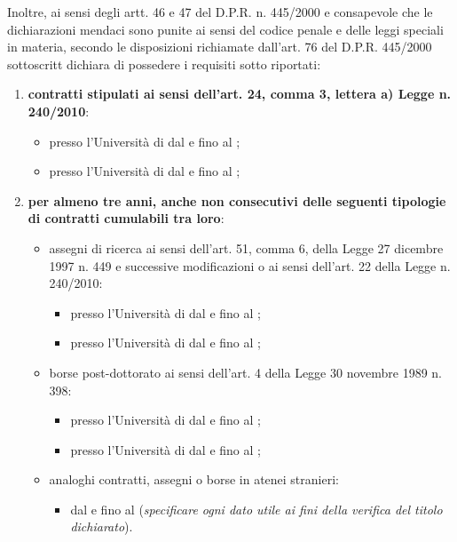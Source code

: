 Inoltre, ai sensi degli artt. 46 e 47 del D.P.R. n. 445/2000 e consapevole che 
le dichiarazioni mendaci sono punite ai sensi del codice penale e delle leggi 
speciali in materia, secondo le disposizioni richiamate dall’art. 76 del D.P.R. 
445/2000  \myTextField[.5cm]{} sottoscritt\myTextField[.5cm]{} dichiara di 
possedere i requisiti sotto riportati:
\begin{enumerate}
\item \textbf{contratti stipulati ai sensi dell'art. 24, comma 3, lettera a) 
Legge n. 240/2010}:
\begin{itemize}
 \item presso l’Università di \myTextField[4.5cm]{} dal \myTextField{} e fino 
 al \myTextField{};
 \item presso l’Università di \myTextField[4.5cm]{} dal \myTextField{} e fino 
 al \myTextField{};
\end{itemize}
\item \textbf{per almeno tre anni, anche non consecutivi delle seguenti tipologie 
di contratti cumulabili tra loro}:
\begin{itemize}
\item assegni di ricerca ai sensi dell’art. 51, comma 6, della Legge 27 dicembre
 1997 n. 449 e successive modificazioni o ai sensi dell’art. 22 della Legge n. 240/2010:
\begin{itemize}
 \item presso l’Università di \myTextField[4.5cm]{} dal \myTextField{} e fino 
 al \myTextField{};
 \item presso l’Università di \myTextField[4.5cm]{} dal \myTextField{} e fino 
 al \myTextField{};
\end{itemize}
\item borse post-dottorato ai sensi dell’art. 4 della Legge 30 novembre 1989 
n. 398:
\begin{itemize}
 \item presso l’Università di \myTextField[4.5cm]{} dal \myTextField{} e fino 
 al \myTextField{};
 \item presso l’Università di \myTextField[4.5cm]{} dal \myTextField{} e fino 
 al \myTextField{};
\end{itemize}
\item analoghi contratti, assegni o borse in atenei stranieri:
\begin{itemize}
\item dal \myTextField{} e fino al \myTextField{} (\emph{specificare ogni dato 
utile ai fini della verifica del titolo dichiarato}).
\end{itemize}

\end{itemize}
\end{enumerate}

